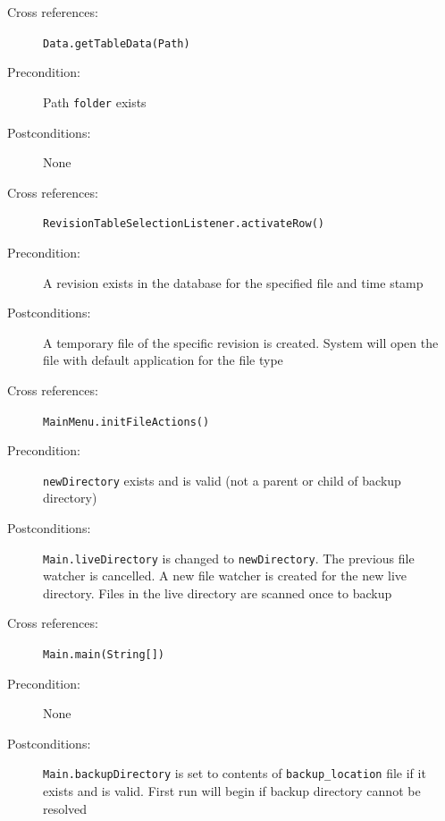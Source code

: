 \documentclass[12pt,a4paper]{article}
\begin{document}
\vspace{0.75cm}

\begin{description}
\item[Cross references:] \texttt{Data.getTableData(Path)}
\item[Precondition:] Path \texttt{folder} exists
\item[Postconditions:] None
\end{description}

\vspace{0.75cm}

\begin{description}
\item[Cross references:] \texttt{RevisionTableSelectionListener.activateRow()}
\item[Precondition:] A revision exists in the database for the specified file and time stamp
\item[Postconditions:] A temporary file of the specific revision is created. System will open the file with default application for the file type
\end{description}

\vspace{0.75cm}

\begin{description}
\item[Cross references:] \texttt{MainMenu.initFileActions()}
\item[Precondition:] \texttt{newDirectory} exists and is valid (not a parent or child of backup directory)
\item[Postconditions:] \texttt{Main.liveDirectory} is changed to \texttt{newDirectory}. The previous file watcher is cancelled. A new file watcher is created for the new live directory. Files in the live directory are scanned once to backup
\end{description}

\vspace{0.75cm}

\begin{description}
\item[Cross references:] \texttt{Main.main(String[])}
\item[Precondition:] None
\item[Postconditions:] \texttt{Main.backupDirectory} is set to contents of \texttt{backup\_{}location} file if it exists and is valid. First run will begin if backup directory cannot be resolved
\end{description}
\end{document}
